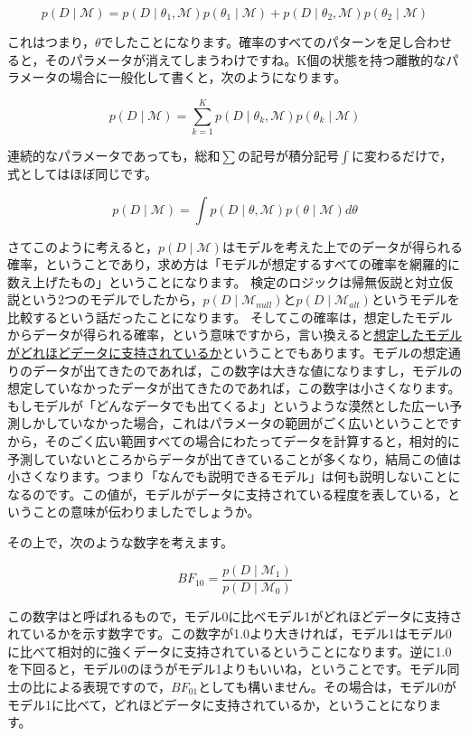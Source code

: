 \documentclass{ltjbook}
\begin{document}
\[ p(D\mid \mathcal{M}) = p(D\mid \theta_1,\mathcal{M})p(\theta_1\mid \mathcal{M}) + p(D\mid \theta_2,\mathcal{M})p(\theta_2\mid \mathcal{M}) \]

これはつまり，$\theta$でしたことになります。確率のすべてのパターンを足し合わせると，そのパラメータが消えてしまうわけですね。K個の状態を持つ離散的なパラメータの場合に一般化して書くと，次のようになります。

\[ p(D\mid \mathcal{M}) = \sum_{k=1}^K p(D\mid \theta_k,\mathcal{M})p(\theta_k\mid \mathcal{M}) \]

連続的なパラメータであっても，総和$\sum$の記号が積分記号$\int$に変わるだけで，式としてはほぼ同じです。

\[ p(D \mid \mathcal{M}) = \int p(D\mid \theta,\mathcal{M})p(\theta\mid\mathcal{M}) d\theta \]

さてこのように考えると，$p(D \mid \mathcal{M})$はモデルを考えた上でのデータが得られる確率，ということであり，求め方は「モデルが想定するすべての確率を網羅的に数え上げたもの」ということになります。
検定のロジックは帰無仮説と対立仮説という2つのモデルでしたから，$p(D \mid \mathcal{M}_{null})$と$p(D \mid \mathcal{M}_{alt})$というモデルを比較するという話だったことになります。
そしてこの確率は，想定したモデルからデータが得られる確率，という意味ですから，言い換えると\underline{想定したモデルがどれほどデータに支持されているか}ということでもあります。モデルの想定通りのデータが出てきたのであれば，この数字は大きな値になりますし，モデルの想定していなかったデータが出てきたのであれば，この数字は小さくなります。もしモデルが「どんなデータでも出てくるよ」というような漠然とした広ーい予測しかしていなかった場合，これはパラメータの範囲がごく広いということですから，そのごく広い範囲すべての場合にわたってデータを計算すると，相対的に予測していないところからデータが出てきていることが多くなり，結局この値は小さくなります。つまり「なんでも説明できるモデル」は何も説明しないことになるのです。この値が，モデルがデータに支持されている程度を表している，ということの意味が伝わりましたでしょうか。

その上で，次のような数字を考えます。

\[ BF_{10} = \frac{p(D\mid \mathcal{M}_1)}{p(D\mid \mathcal{M}_0)} \]

この数字はと呼ばれるもので，モデル0に比べモデル1がどれほどデータに支持されているかを示す数字です。この数字が1.0より大きければ，モデル1はモデル0に比べて相対的に強くデータに支持されているということになります。逆に1.0を下回ると，モデル0のほうがモデル1よりもいいね，ということです。モデル同士の比による表現ですので，$BF_{01}$としても構いません。その場合は，モデル0がモデル1に比べて，どれほどデータに支持されているか，ということになります。
\end{document}
